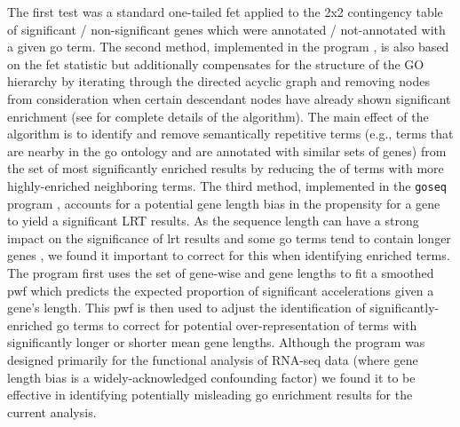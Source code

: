 The first test was a standard one-tailed \ac{fet} applied to the 2x2
contingency table of significant / non-significant genes which were
annotated / not-annotated with a given \ac{go} term. The second
method, implemented in the \topgo program \citep{Alexa2006a}, is also
based on the \ac{fet} statistic but additionally compensates for the
structure of the GO hierarchy by iterating through the directed
acyclic graph and removing nodes from consideration when certain
descendant nodes have already shown significant enrichment (see
\citet{Alexa2006a} for complete details of the algorithm). The main
effect of the \topgo algorithm is to identify and remove semantically
repetitive terms (e.g., terms that are nearby in the \ac{go} ontology
and are annotated with similar sets of genes) from the set of most
significantly enriched results by reducing the \pvs of terms with more
highly-enriched neighboring terms. The third method, implemented in
the \texttt{goseq} program \citep{Young2010a}, accounts for a
potential gene length bias in the propensity for a gene to yield a
significant LRT results. As the sequence length can have a strong
impact on the significance of \ac{lrt} results \citep{Anisimova2001}
and some \ac{go} terms tend to contain longer genes
\citep{Young2010a}, we found it important to correct for this when
identifying enriched terms. The \goseq program first uses the
set of gene-wise \pvs and gene lengths to fit a smoothed \ac{pwf}
which predicts the expected proportion of significant accelerations
given a gene’s length. This \ac{pwf} is then used to adjust the
identification of significantly-enriched \ac{go} terms to correct for
potential over-representation of terms with significantly longer or
shorter mean gene lengths. Although the \goseq program was
designed primarily for the functional analysis of RNA-seq data (where
gene length bias is a widely-acknowledged confounding factor) we found
it to be effective in identifying potentially misleading \ac{go}
enrichment results for the current analysis.


